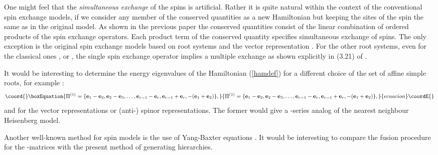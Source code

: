 \documentclass[a4paper,12pt]{article}
\begin{document}
One might feel that the
{\em simultaneous exchange}  of the spins is artificial.
Rather it is  quite
natural within the context of the conventional spin exchange models, if we
consider any member of the conserved quantities as a new
Hamiltonian but keeping
the sites of the spin the same as in the original model.
As shown in the previous paper \cite{is1} the conserved quantities consist
of the linear combination of ordered products of the spin exchange
operators.
Each product term of the conserved quantity specifies
simultaneous exchange of
spins. The only exception is the original
spin exchange models based on \coordHE{} root
systems and the vector representation \coordHE{}.
For the other root systems, even
for the classical ones \coordHE{}, \coordHE{} or \coordHE{},
the single spin exchange operator
implies a multiple exchange as shown explicitly in (3.21) of \cite{is1}.

It would be interesting to determine the energy eigenvalues of the
Hamiltonian
(\ref{hamdef}) for a different choice of the set
of affine simple roots, for example
\coordHE{}:
\begin{equation}\coord{}\boxEquation{
\Pi^{(1)}=\{{\bf e}_1-{\bf e}_2,{\bf e}_2-{\bf e}_3,\ldots,
{\bf e}_{r-1}-{\bf e}_{r}, {\bf e}_{r-1}+{\bf
e}_{r},-({\bf e}_{1}+{\bf e}_2)\},
\label{drafroots}
}{
\Pi^{(1)}=\{{\bf e}_1-{\bf e}_2,{\bf e}_2-{\bf e}_3,\ldots,
{\bf e}_{r-1}-{\bf e}_{r}, {\bf e}_{r-1}+{\bf
e}_{r},-({\bf e}_{1}+{\bf e}_2)\},
}{ecuacion}\coordE{}\end{equation}
and for the \coordHE{} vector representations or (anti-) spinor representations.
The former would give a \coordHE{}-series analog of
the nearest neighbour Heisenberg model.

Another well-known method for spin models is the use of Yang-Baxter
equations
\cite{kulskl}. It would be interesting to compare the fusion procedure for
the
\coordHE{}-matrices with the present method of generating hierarchies.
\end{document}

